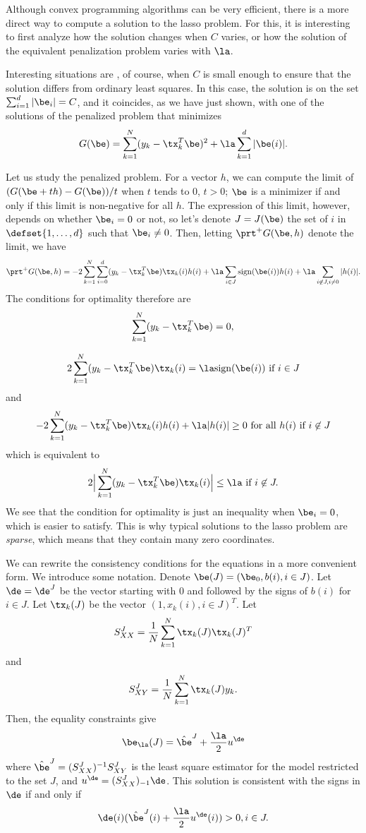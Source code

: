 Although convex programming algorithms can be very efficient, there is
a more direct way to compute a solution to the lasso problem. For
this, it is interesting to first analyze how the solution changes when
$C$ varies, or how the solution of the equivalent penalization problem
varies with $\la$.

Interesting situations
are , of course, when $C$ is small enough to ensure that the solution
differs from ordinary least squares. In this case, the solution is on
the set $\sum_{i=1}^d |\be_i| = C$, and it coincides, as we have just shown, with one of the
solutions of the penalized problem that minimizes 
$$
G(\be) = \sum_{k=1}^N (y_k - \tx_k^T\be)^2 + \la \sum_{k=1}^d |\be(i)|.
$$

Let us study the penalized problem. For a vector $h$, we can compute the limit of $(G(\be+th) -
G(\be))/t$ when $t$ tends to 0, $t>0$; $\be$ is a minimizer if and
only if this limit is non-negative for all $h$. The expression of this
limit, however, depends on whether $\be_i=0$ or not, so let's denote
$J = J(\be)$ the set of $i$ in $\defset{1, \ldots, d}$ such that
$\be_i \neq 0$. Then, letting $\prt^+ G(\be, h)$ denote the limit, we
have
$$
\prt^+ G(\be, h) = -2\sum_{k=1}^N \sum_{i=0}^d (y_k - \tx_k^T\be)
\tx_k(i)h(i) + \la \sum_{i\in J} \mathrm{sign}(\be(i)) h(i) + \la
\sum_{i\not\in J, i\neq 0} |h(i)|.
$$
The conditions for optimality therefore are
$$
\sum_{k=1}^N (y_k - \tx_k^T\be) = 0,
$$

$$
2\sum_{k=1}^N (y_k - \tx_k^T\be)
\tx_k(i) = \la \mathrm{sign}(\be(i)) \text{ if } i\in J
$$
and
$$
- 2\sum_{k=1}^N (y_k - \tx_k^T\be)
\tx_k(i)h(i) + \la |h(i)| \geq 0 \text{ for all $h(i)$ if } i\not\in J
$$
which is equivalent to
$$
2\Big|\sum_{k=1}^N (y_k - \tx_k^T\be)
\tx_k(i)\Big| \leq  \la  \text{ if } i\not\in J.
$$
We see that the condition for optimality is just an inequality when
$\be_i=0$, which is easier to satisfy. This is why typical solutions
to the lasso problem are {\em sparse}, which means that they contain
many zero coordinates.

 We can rewrite the consistency conditions for the
equations in a more convenient form. We introduce some notation.
Denote $\be(J) = (\be_0, b(i), i\in J)$. Let $\de = \de^J$ be the vector
starting with 0 and followed by the signs of $b(i)$ for $i\in J$. Let
$\tx_k(J)$ be the vector $(1, x_k(i), i\in J)^T$. Let
$$
S_{XX}^J = \frac{1}{N} \sum_{k=1}^N \tx_k(J)\tx_k(J)^T
$$
and 
$$
S_{XY}^J = \frac{1}{N} \sum_{k=1}^N \tx_k(J)y_k.
$$
Then, the equality constraints give
\begin{equation}
\label{eq:cons.lasso.0}
\be_\la(J) = \hat \be^J + \frac\la2 u^\de
\end{equation}
where
$\hat\be^J = (S_{XX}^J)^{-1}S_{XY}^J$ is the least square estimator
for the model restricted to the set $J$, and $u^\de =
(S_{XX}^J)_{-1}\de$. This solution is consistent with the signs in
$\de$ if and only if
\begin{equation}
\label{eq:cons.lasso.1}
\de(i)(\hat \be^J(i) + \frac\la2 u^\de(i)) > 0, i\in J.
\end{equation}

